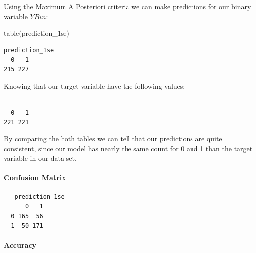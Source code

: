 \documentclass[
]{article}
\newenvironment{Shaded}{\begin{snugshade}}{\end{snugshade}}
\newcommand{\FunctionTok}[1]{\textcolor[rgb]{0.00,0.00,0.00}{#1}}
\newcommand{\NormalTok}[1]{#1}
\newcommand{\OtherTok}[1]{\textcolor[rgb]{0.56,0.35,0.01}{#1}}
\newcommand{\SpecialCharTok}[1]{\textcolor[rgb]{0.00,0.00,0.00}{#1}}
\begin{document}
Using the Maximum A Posteriori criteria we can make predictions for our
binary variable \(YBin\):

\begin{Shaded}
\begin{Highlighting}[]
\FunctionTok{table}\NormalTok{(prediction\_1se)}
\end{Highlighting}
\end{Shaded}

\begin{verbatim}
prediction_1se
  0   1 
215 227 
\end{verbatim}

Knowing that our target variable have the following values:

\begin{Shaded}
\end{Shaded}

\begin{verbatim}

  0   1 
221 221 
\end{verbatim}

By comparing the both tables we can tell that our predictions are quite
consistent, since our model has nearly the same count for 0 and 1 than
the target variable in our data set.

\hypertarget{confusion-matrix-4}{%
\paragraph{Confusion Matrix}\label{confusion-matrix-4}}

\begin{Shaded}
\end{Shaded}

\begin{verbatim}
   prediction_1se
      0   1
  0 165  56
  1  50 171
\end{verbatim}

\hypertarget{accuracy-4}{%
\paragraph{Accuracy}\label{accuracy-4}}
\end{document}
